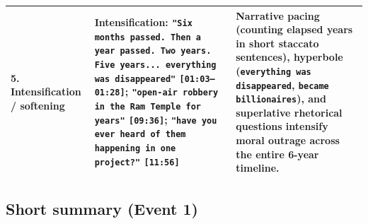 \documentclass[10pt,a4paper]{article}
\begin{document}
\begin{longtable}{@{}>{\raggedright\arraybackslash}p{} >{\raggedright\arraybackslash}p{} >{\raggedright\arraybackslash}p{}@{}}
\addlinespace[4pt]
\textbf{5. Intensification / softening} & \textbf{Intensification:} \texttt{"Six months passed. Then a year passed. Two years. Five years... everything was disappeared"} \texttt{[01:03--01:28]}; \texttt{"open-air robbery in the Ram Temple for years"} \texttt{[09:36]}; \texttt{"have you ever heard of them happening in one project?"} \texttt{[11:56]} & Narrative pacing (counting elapsed years in short staccato sentences), hyperbole (\texttt{everything was disappeared}, \texttt{became billionaires}), and superlative rhetorical questions intensify moral outrage across the entire 6-year timeline. \\
\bottomrule
\end{longtable}

\subsection*{Short summary (Event 1)}
\end{document}
